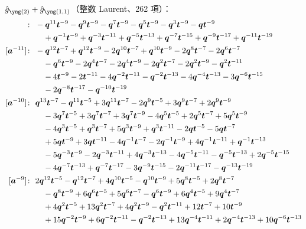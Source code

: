 $\hat g_{\ytwo} + \hat g_{\yoneone}$（整数 Laurent、262 項）：
\begin{align*}
[\ba^{-12}]\colon\ & -\bq^{11} \bt^{-9} -\bq^{9} \bt^{-9} -\bq^{7} \bt^{-9} -\bq^{5} \bt^{-9} -\bq^{3} \bt^{-9} -\bq \bt^{-9} \\
& \quad +\bq^{-1} \bt^{-9} +\bq^{-3} \bt^{-11} +\bq^{-5} \bt^{-13} +\bq^{-7} \bt^{-15} +\bq^{-9} \bt^{-17} +\bq^{-11} \bt^{-19} \\
[\ba^{-11}]\colon\ & -\bq^{12} \bt^{-7} +\bq^{12} \bt^{-9} -2 \bq^{10} \bt^{-7} +\bq^{10} \bt^{-9} -2 \bq^{8} \bt^{-7} -2 \bq^{6} \bt^{-7} \\
& \quad -\bq^{6} \bt^{-9} -2 \bq^{4} \bt^{-7} -2 \bq^{4} \bt^{-9} -2 \bq^{2} \bt^{-7} -2 \bq^{2} \bt^{-9} -\bq^{2} \bt^{-11} \\
& \quad -4 \bt^{-9} -2 \bt^{-11} -4 \bq^{-2} \bt^{-11} -\bq^{-2} \bt^{-13} -4 \bq^{-4} \bt^{-13} -3 \bq^{-6} \bt^{-15} \\
& \quad -2 \bq^{-8} \bt^{-17} -\bq^{-10} \bt^{-19} \\
[\ba^{-10}]\colon\ & \bq^{13} \bt^{-7} -\bq^{11} \bt^{-5} +3 \bq^{11} \bt^{-7} -2 \bq^{9} \bt^{-5} +3 \bq^{9} \bt^{-7} +2 \bq^{9} \bt^{-9} \\
& \quad -3 \bq^{7} \bt^{-5} +3 \bq^{7} \bt^{-7} +3 \bq^{7} \bt^{-9} -4 \bq^{5} \bt^{-5} +2 \bq^{5} \bt^{-7} +5 \bq^{5} \bt^{-9} \\
& \quad -4 \bq^{3} \bt^{-5} +\bq^{3} \bt^{-7} +5 \bq^{3} \bt^{-9} +\bq^{3} \bt^{-11} -2 \bq \bt^{-5} -5 \bq \bt^{-7} \\
& \quad +5 \bq \bt^{-9} +3 \bq \bt^{-11} -4 \bq^{-1} \bt^{-7} -2 \bq^{-1} \bt^{-9} +4 \bq^{-1} \bt^{-11} +\bq^{-1} \bt^{-13} \\
& \quad -5 \bq^{-3} \bt^{-9} -2 \bq^{-3} \bt^{-11} +4 \bq^{-3} \bt^{-13} -4 \bq^{-5} \bt^{-11} -\bq^{-5} \bt^{-13} +2 \bq^{-5} \bt^{-15} \\
& \quad -4 \bq^{-7} \bt^{-13} +\bq^{-7} \bt^{-17} -3 \bq^{-9} \bt^{-15} -2 \bq^{-11} \bt^{-17} -\bq^{-13} \bt^{-19} \\
[\ba^{-9}]\colon\ & 2 \bq^{12} \bt^{-5} -\bq^{12} \bt^{-7} +4 \bq^{10} \bt^{-5} -\bq^{10} \bt^{-9} +5 \bq^{8} \bt^{-5} +2 \bq^{8} \bt^{-7} \\
& \quad -\bq^{8} \bt^{-9} +6 \bq^{6} \bt^{-5} +5 \bq^{6} \bt^{-7} -\bq^{6} \bt^{-9} +6 \bq^{4} \bt^{-5} +9 \bq^{4} \bt^{-7} \\
& \quad +4 \bq^{2} \bt^{-5} +13 \bq^{2} \bt^{-7} +4 \bq^{2} \bt^{-9} -\bq^{2} \bt^{-11} +12 \bt^{-7} +10 \bt^{-9} \\
& \quad +15 \bq^{-2} \bt^{-9} +6 \bq^{-2} \bt^{-11} -\bq^{-2} \bt^{-13} +13 \bq^{-4} \bt^{-11} +2 \bq^{-4} \bt^{-13} +10 \bq^{-6} \bt^{-13} \\

\end{align*}
